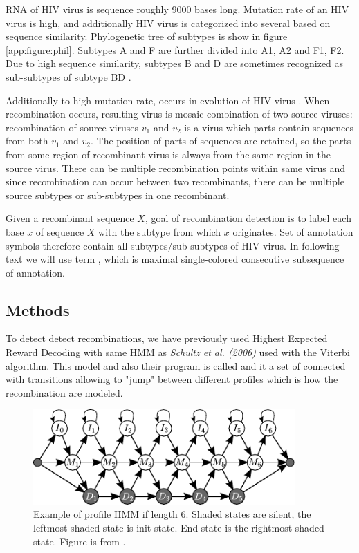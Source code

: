 RNA of HIV virus is sequence roughly $9000$ bases long. Mutation rate of an HIV
virus is high\cite{}, and additionally HIV virus is categorized into several
\cite{} based on sequence similarity. Phylogenetic tree of
subtypes is show in figure \ref{app:figure:phil}.  Subtypes A and F are further
divided into  A1, A2 and F1, F2.  Due to high sequence
similarity, subtypes B and D are sometimes recognized as sub-subtypes of subtype
BD \cite{}.

Additionally to high mutation rate,  occurs in
evolution of HIV virus \cite{}. When recombination occurs, resulting virus is
mosaic combination of two source viruses: recombination of source viruses $v_1$
and $v_2$ is a virus which parts contain sequences from both $v_1$ and $v_2$.  The
position of parts of sequences are retained, so the parts from some region of
recombinant virus is always from the same region in the source virus.
There can be multiple recombination points within same virus and since
recombination can occur between two recombinants, there can be multiple source
subtypes or sub-subtypes in one recombinant. 

Given a recombinant sequence $X$, goal of recombination detection is to label
each base $x$ of sequence $X$ with the subtype from which $x$ originates.  Set
of annotation symbols therefore contain all subtypes/sub-subtypes of HIV virus.
In following text we will use term , which is maximal
single-colored consecutive subsequence of annotation.

\subsection{Methods}

To detect detect recombinations, we have previously used Highest Expected Reward
Decoding \cite{Nanasi2010mgr, Nanasi2010} with same HMM as {\it Schultz et al.
(2006)}\nocite{Schultz2006} used with the Viterbi algorithm. This model and also
their program is called  and it a set of
\cite{Durbin1998}
connected with transitions allowing to "jump" between different profiles which
is how the recombination are modeled.

\begin{figure}
\begin{center}
\includegraphics[width=10cm]{../figures/profile_hmm}
\end{center}
\caption[Profile HMM]{Example of profile HMM if length $6$. Shaded states are
silent, the leftmost shaded state is init state. End state is the rightmost
shaded state. Figure is from \cite{Nanasi2010mgr}.}\label{FIGURE:PROFILEHMM}
\end{figure}

